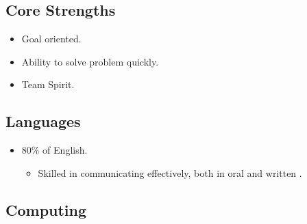\documentclass[21pt, onecolumn]{article} %
\begin{document}
\subsection*{ Core Strengths }

\begin{itemize}
    \item Goal oriented.
    \item Ability to solve problem quickly.
    \item Team Spirit.
\end{itemize}


\subsection*{ Languages }

\begin{itemize}
 \item 80\% of English.\\
\begin{itemize}
 \item Skilled in communicating effectively, both in oral and written .
\end{itemize}
\end{itemize}


\subsection*{ Computing }
\end{document}
